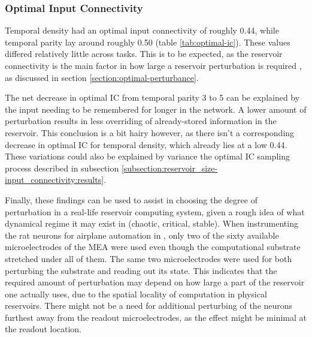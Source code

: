 \subsubsection{Optimal Input Connectivity}

Temporal density had an optimal input connectivity of roughly 0.44, while temporal parity lay around roughly 0.50 (table \ref{tab:optimal-ic}).
These values differed relatively little across tasks.
This is to be expected, as the reservoir connectivity is the main factor in how large a reservoir perturbation is required \cite{rbn-reservoir},
as discussed in section \ref{section:optimal-perturbance}.

The net decrease in optimal IC from temporal parity 3 to 5 can be explained by the input needing to be remembered for longer in the network.
A lower amount of perturbation results in less overriding of already-stored information in the reservoir.
This conclusion is a bit hairy however,
as there isn't a corresponding decrease in optimal IC for temporal density, which already lies at a low 0.44.
These variations could also be explained by variance the optimal IC sampling process described in subsection \ref{subsection:reservoir_size-input_connectivity:results}.

Finally, these findings can be used to assist in choosing the degree of perturbation in a real-life reservoir computing system,
given a rough idea of what dynamical regime it may exist in (chaotic, critical, stable).
When instrumenting the rat neurons for airplane automation in \cite{demarse2005adaptive},
only two of the sixty available microelectrodes of the MEA were used even though the computational substrate stretched under all of them.
The same two microelectrodes were used for both perturbing the substrate and reading out its state.
This indicates that the required amount of perturbation may depend on how large a part of the reservoir one actually uses,
due to the spatial locality of computation in physical reservoirs.
There might not be a need for additional perturbing of the neurons furthest away from the readout microelectrodes,
as the effect might be minimal at the readout location.

